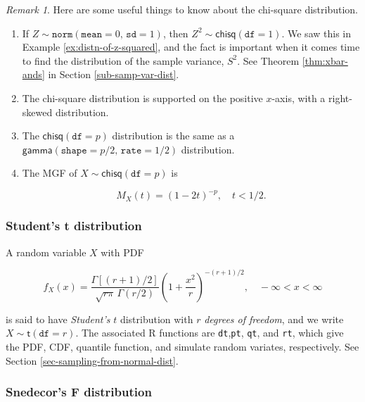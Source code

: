 \documentclass[]{book}
\providecommand{\tightlist}{%
  \setlength{\itemsep}{0pt}\setlength{\parskip}{0pt}}
\numberwithin{equation}{chapter}
\numberwithin{figure}{chapter}
\theoremstyle{plain}
\theoremstyle{definition}
\theoremstyle{remark}
\theoremstyle{definition}
\theoremstyle{definition}
\theoremstyle{remark}
\newtheorem*{remark}{Remark}
\begin{document}
\begin{remark}
Here are some useful things to know about the chi-square distribution.

\begin{enumerate}
\def\labelenumi{\arabic{enumi}.}
\tightlist
\item
  If \(Z\sim\mathtt{norm}(\mathtt{mean}=0,\,\mathtt{sd}=1)\), then
  \(Z^{2}\sim\mathsf{chisq}(\mathtt{df}=1)\). We saw this in Example
  \ref{ex:distn-of-z-squared}, and the fact is important when it comes
  time to find the distribution of the sample variance, \(S^{2}\). See
  Theorem \ref{thm:xbar-ands} in Section \ref{sub-samp-var-dist}.
\item
  The chi-square distribution is supported on the positive \(x\)-axis,
  with a right-skewed distribution.
\item
  The \(\mathsf{chisq}(\mathtt{df}=p)\) distribution is the same as a
  \(\mathsf{gamma}(\mathtt{shape}=p/2,\,\mathtt{rate}=1/2)\)
  distribution.
\item
  The MGF of \(X\sim\mathsf{chisq}(\mathtt{df}=p)\) is

  \begin{equation}
     \label{eq-mgf-chisq}
     M_{X}(t)=\left(1-2t\right)^{-p},\quad t < 1/2.
     \end{equation}
\end{enumerate}
\end{remark}

\subsubsection{Student's t
distribution}\label{sub-students-t-distribution}

A random variable \(X\) with PDF

\begin{equation}
f_{X}(x) = \frac{\Gamma\left[ (r+1)/2\right] }{\sqrt{r\pi}\,\Gamma(r/2)}\left( 1 + \frac{x^{2}}{r} \right)^{-(r+1)/2},\quad -\infty < x < \infty
\end{equation}

is said to have \emph{Student's} \(t\) distribution with \(r\)
\emph{degrees of freedom}, and we write
\(X\sim\mathsf{t}(\mathtt{df}=r)\). The associated R functions are
\texttt{dt},\texttt{pt}, \texttt{qt}, and \texttt{rt}, which give the
PDF, CDF, quantile function, and simulate random variates, respectively.
See Section \ref{sec-sampling-from-normal-dist}.

\subsubsection{Snedecor's F
distribution}\label{sub-snedecor-F-distribution}
\end{document}

